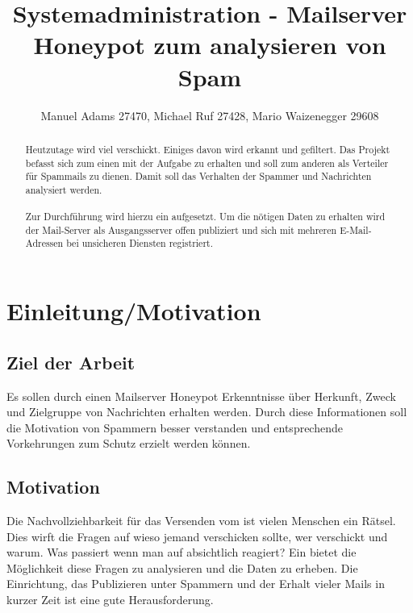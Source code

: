\documentclass[a4paper,11pt,singlespacing]{article}
\begin{document}

\title{Systemadministration - Mailserver Honeypot zum analysieren von Spam}
\author{Manuel Adams 27470, Michael Ruf 27428, Mario Waizenegger 29608}
\maketitle
\begin{abstract}
Heutzutage wird viel  verschickt. Einiges davon wird erkannt und gefiltert.
Das Projekt befasst sich zum einen mit der Aufgabe  zu erhalten und soll zum anderen als Verteiler für Spammails zu dienen.
Damit soll das Verhalten der Spammer und  Nachrichten analysiert werden.
\\\\
Zur Durchführung wird hierzu ein   aufgesetzt.
Um die nötigen Daten zu erhalten wird der Mail-Server als Ausgangsserver offen publiziert und sich mit mehreren E-Mail-Adressen bei unsicheren Diensten registriert.
\end{abstract}

\newpage

\tableofcontents

\newpage
{}

\section{Einleitung/Motivation}\label{sec:Einleitung}

	\subsection{Ziel der Arbeit}\label{sec:EinleitungZiel}
		Es sollen durch einen Mailserver Honeypot Erkenntnisse über Herkunft, Zweck und Zielgruppe von  Nachrichten erhalten werden.
		Durch diese Informationen soll die Motivation von Spammern besser verstanden und entsprechende Vorkehrungen zum Schutz erzielt werden können.

	\subsection{Motivation}\label{sec:EinleitungMotivation}
		Die Nachvollziehbarkeit für das Versenden vom  ist vielen Menschen ein Rätsel.
		Dies wirft die Fragen auf wieso jemand  verschicken sollte, wer  verschickt und warum.
		Was passiert wenn man auf  absichtlich reagiert?
		Ein   bietet die Möglichkeit diese Fragen zu analysieren und die Daten zu erheben.
		Die Einrichtung, das Publizieren unter Spammern und der Erhalt vieler  Mails in kurzer Zeit ist eine gute Herausforderung.
	
\end{document}
